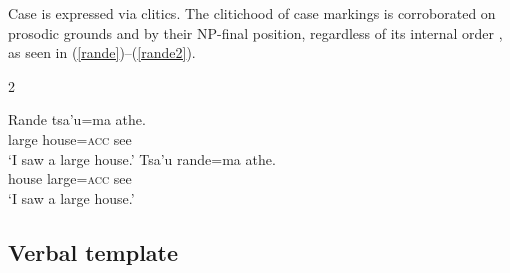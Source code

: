 \documentclass[output=paper,colorlinks,citecolor=brown]{langscibook}
\begin{document}
Case is expressed via clitics. The clitichood of  case markings is corroborated on prosodic grounds \citep[they stand outside of the phonological noun,][]{dabkowski2019morphophonology} and by their NP-final position, regardless of its internal order \citep{fischerhengeveld}, as seen in (\ref{rande})--(\ref{rande2}).
\begin{multicols}{2}
\begin{exe}
    \ex\label{rande}     \gll Rande tsa'u=ma athe. \\
         large house=\textsc{acc} see \\
    \glt `I saw a large house.'
    \ex\label{rande2}     \gll Tsa'u rande=ma athe. \\
         house large=\textsc{acc} see \\
    \glt `I saw a large house.'
\end{exe}
\end{multicols}




\subsection{Verbal template}
\label{sec:conjugation}


\newcommand{\clr}{\cellcolor{gray!15}}
\end{document}
